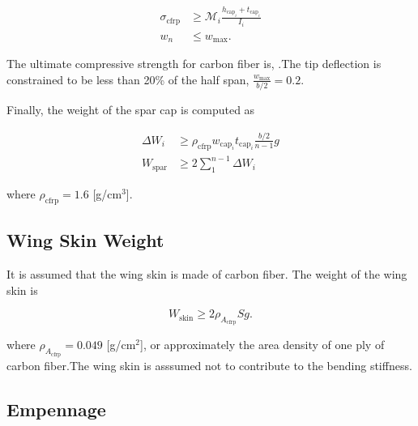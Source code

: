 \begin{align}
    \label{e:stresscont}
    \sigma_{\text{cfrp}} &\geq \mathcal{M}_i \frac{h_{\text{cap}_i}+t_{\text{cap}_i}}{I_i}\\
    \label{e:defcont}
    w_n &\leq w_{\text{max}}.
\end{align}

The ultimate compressive strength for carbon fiber is, \DIFdelbegin {}\DIFdelend \DIFaddbegin {}\DIFaddend [MPa].\DIFdelbegin {}\DIFdelend \DIFaddbegin {}\DIFaddend The tip deflection is constrained to be less than 20\% of the half span, $\frac{w_{\text{max}}}{b/2} = 0.2$.

Finally, the weight of the spar cap is computed as

\begin{align}
    \label{e:sparmass}
    \Delta W_i &\geq \rho_{\text{cfrp}} w_{\text{cap}_i}t_{\text{cap}_i} \frac{b/2}{n-1}g \\
    \label{e:sparmasssum}
    W_{\text{spar}} &\geq 2 \sum\limits_{1}^{n-1} \Delta W_i
\end{align}

where $\rho_{\text{cfrp}} = 1.6$ [g/cm$^3$].\DIFdelbegin {}\DIFdelend \DIFaddbegin {}\DIFaddend 

\subsection{Wing Skin Weight}

It is assumed that the wing skin is made of carbon fiber.  The weight of the wing skin is 

\begin{equation}
    \label{e:wingskinweight}
    W_{\text{skin}} \geq 2 \rho_{A_{\text{cfrp}}} S g.
\end{equation}

where $\rho_{A_{\text{cfrp}}} = 0.049$ [g/cm$^2$], or approximately the area density of one ply of carbon fiber.\DIFdelbegin {}\DIFdelend \DIFaddbegin {}\DIFaddend The wing skin is asssumed not to contribute to the bending stiffness. 

\subsection{Empennage}

